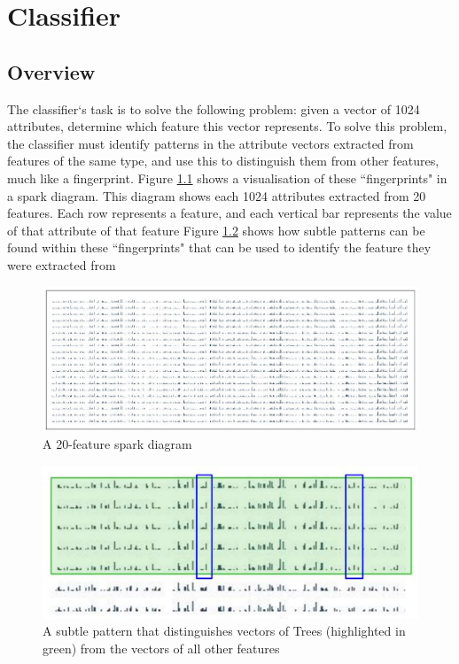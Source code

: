 \chapter{Classifier}
\section{Overview}
The classifier`s task is to solve the following problem: given a vector of 1024 attributes, determine which feature this vector represents. To solve this problem, the classifier must identify patterns in the attribute vectors extracted from features of the same type, and use this to distinguish them from other features, much like a fingerprint. 
Figure \ref{fig:spark_problem} shows a visualisation of these ``fingerprints" in a spark diagram. This diagram shows each 1024 attributes extracted from 20 features. Each row represents a feature, and each vertical bar represents the value of that attribute of that feature
Figure \ref{fig:spark_solution} shows how subtle patterns can be found within these ``fingerprints" that can be used to identify the feature they were extracted from
\begin{figure}[H]
    \centering
    \includegraphics[width=\textwidth]{figs/8/spark_diagram}
    \caption{A 20-feature spark diagram}
    \label{fig:spark_problem}
\end{figure}

\begin{figure}[H]
    \centering
    \includegraphics[width=\textwidth]{figs/8/spark_solution}
    \caption{ A subtle pattern that distinguishes vectors of Trees (highlighted in green) from the vectors of all other features}
    \label{fig:spark_solution}
\end{figure}

